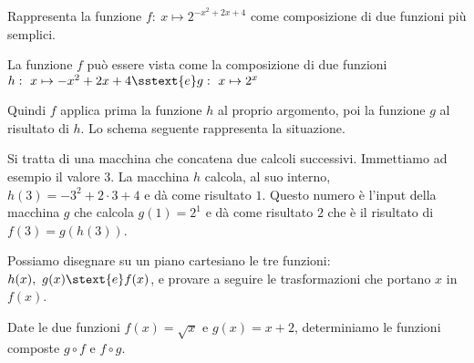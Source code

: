 \begin{esempio}
Rappresenta la funzione  \(f:~x \mapsto 2^{-x^2+2x+4}\)
come composizione di due funzioni più semplici. 

La funzione \(f\) può essere vista come la composizione di due funzioni 
\(h:~x \mapsto -x^2+2x+4 \sstext{e} g:~x \mapsto 2^x\) 

Quindi \(f\) applica prima la funzione \(h\) al proprio argomento, poi la 
funzione \(g\) al risultato di \(h\).
Lo schema seguente rappresenta la situazione.

\hspace{-7mm}\scalebox{.8}{\boxfunzionecompostab}
\label{gra:differenziazione_boxcompostaa}

Si tratta di una macchina che concatena due calcoli successivi. 
Immettiamo ad esempio il valore \(3\). 
La macchina \(h\) calcola, al suo interno, \(h(3)=-3^2+2\cdot 3+4\) e dà 
come risultato \(1\).
Questo numero è l'input della macchina \(g\) che calcola 
\(g(1)=2^1\) e dà come risultato \(2\)
che è il risultato di \(f(3) = g(h(3))\).

Possiamo disegnare su un piano cartesiano le tre funzioni: 
\(h(x),~g(x) \stext{e} f(x)\), e provare a seguire le trasformazioni che 
portano \(x\) in \(f(x)\).

\end{esempio}

\begin{esempio} 
Date le due funzioni \(f(x)=\sqrt{x}\) e \(g(x)= x+2\), determiniamo le 
funzioni composte \(g \circ f\) e \(f\circ g\).

\end{esempio}

